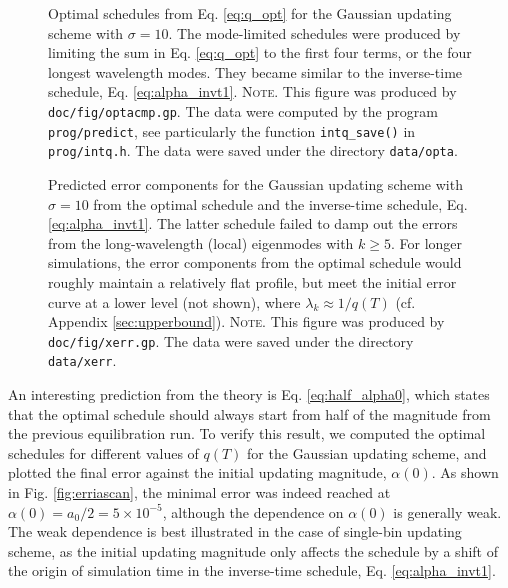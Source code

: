 \documentclass[reprint, superscriptaddress, floatfix]{revtex4-1}
\newcommand{\note}[1]{{\color{DarkGreen}\footnotesize \textsc{Note.} #1}}
\begin{document}
\begin{figure}[h]
\begin{center}
  \caption{
    \label{fig:optacmp}
    Optimal schedules from Eq. \eqref{eq:q_opt}
    for the Gaussian updating scheme
    with $\sigma = 10$.
    The mode-limited schedules were produced by
    limiting the sum in Eq. \eqref{eq:q_opt}
    to the first four terms,
    or the four longest wavelength modes.
    They became similar to the inverse-time schedule,
    Eq. \eqref{eq:alpha_invt1}.
    \note{This figure was produced by \texttt{doc/fig/optacmp.gp}.
      The data were computed by the program \texttt{prog/predict},
      see particularly the function \texttt{intq\_save()}
      in \texttt{prog/intq.h}.
      The data were saved under the directory \texttt{data/opta}.
    }%
  }
\end{center}
\end{figure}


\begin{figure}[h]
\begin{center}
  \caption{
    \label{fig:xerr}
    Predicted error components for the Gaussian updating scheme
    with $\sigma = 10$
    from the optimal schedule
    and the inverse-time schedule, Eq. \eqref{eq:alpha_invt1}.
    The latter schedule failed to damp out the errors
    from the long-wavelength (local) eigenmodes
    with $k \ge 5$.
    For longer simulations,
    the error components from the optimal schedule
    would roughly maintain a relatively flat profile,
    but meet the initial error curve
    at a lower level (not shown),
    where $\lambda_k \approx 1/q(T)$
    (cf. Appendix \ref{sec:upperbound}).
    \note{This figure was produced by \texttt{doc/fig/xerr.gp}.
      The data were saved under the directory \texttt{data/xerr}.
    }%
  }
\end{center}
\end{figure}


An interesting prediction from the theory is Eq. \eqref{eq:half_alpha0},
which states that the optimal schedule should always start from
half of the magnitude from the previous equilibration run.
%
To verify this result,
we computed the optimal schedules
for different values of $q(T)$
for the Gaussian updating scheme,
and plotted the final error
against the initial updating magnitude, $\alpha(0)$.
%
As shown in Fig. \ref{fig:erriascan},
the minimal error was indeed reached at
$\alpha(0) = a_0/2 = 5 \times 10^{-5}$,
although the dependence on $\alpha(0)$
is generally weak.
%
The weak dependence is best illustrated in
the case of single-bin updating scheme,
as the initial updating magnitude only
affects the schedule by a shift of the origin of
simulation time in the inverse-time schedule,
Eq. \eqref{eq:alpha_invt1}.
\end{document}
